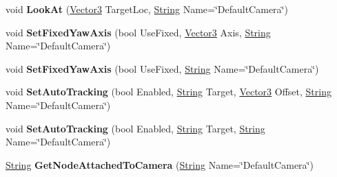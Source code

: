 \begin{DoxyCompactItemize}
\item 
\hypertarget{classphys_1_1CameraManager_a885a499a53c3543b6bf429583a2cb54c}{
void {\bfseries LookAt} (\hyperlink{classphys_1_1Vector3}{Vector3} TargetLoc, \hyperlink{namespacephys_aa03900411993de7fbfec4789bc1d392e}{String} Name=\char`\"{}DefaultCamera\char`\"{})}
\label{d9/d91/classphys_1_1CameraManager_a885a499a53c3543b6bf429583a2cb54c}

\item 
\hypertarget{classphys_1_1CameraManager_ac29a1b3cd34ff2810bee170aa233c77e}{
void {\bfseries SetFixedYawAxis} (bool UseFixed, \hyperlink{classphys_1_1Vector3}{Vector3} Axis, \hyperlink{namespacephys_aa03900411993de7fbfec4789bc1d392e}{String} Name=\char`\"{}DefaultCamera\char`\"{})}
\label{d9/d91/classphys_1_1CameraManager_ac29a1b3cd34ff2810bee170aa233c77e}

\item 
\hypertarget{classphys_1_1CameraManager_aa7370f2239e88ab151b72c4171afea07}{
void {\bfseries SetFixedYawAxis} (bool UseFixed, \hyperlink{namespacephys_aa03900411993de7fbfec4789bc1d392e}{String} Name=\char`\"{}DefaultCamera\char`\"{})}
\label{d9/d91/classphys_1_1CameraManager_aa7370f2239e88ab151b72c4171afea07}

\item 
\hypertarget{classphys_1_1CameraManager_a43d55c71817096add5dad1552239fc74}{
void {\bfseries SetAutoTracking} (bool Enabled, \hyperlink{namespacephys_aa03900411993de7fbfec4789bc1d392e}{String} Target, \hyperlink{classphys_1_1Vector3}{Vector3} Offset, \hyperlink{namespacephys_aa03900411993de7fbfec4789bc1d392e}{String} Name=\char`\"{}DefaultCamera\char`\"{})}
\label{d9/d91/classphys_1_1CameraManager_a43d55c71817096add5dad1552239fc74}

\item 
\hypertarget{classphys_1_1CameraManager_a6edd94b6e8d9f2fa1e0b84554b367933}{
void {\bfseries SetAutoTracking} (bool Enabled, \hyperlink{namespacephys_aa03900411993de7fbfec4789bc1d392e}{String} Target, \hyperlink{namespacephys_aa03900411993de7fbfec4789bc1d392e}{String} Name=\char`\"{}DefaultCamera\char`\"{})}
\label{d9/d91/classphys_1_1CameraManager_a6edd94b6e8d9f2fa1e0b84554b367933}

\item 
\hypertarget{classphys_1_1CameraManager_a52a62fcfbeed45a2f527f626731ddcc1}{
\hyperlink{namespacephys_aa03900411993de7fbfec4789bc1d392e}{String} {\bfseries GetNodeAttachedToCamera} (\hyperlink{namespacephys_aa03900411993de7fbfec4789bc1d392e}{String} Name=\char`\"{}DefaultCamera\char`\"{})}
\label{d9/d91/classphys_1_1CameraManager_a52a62fcfbeed45a2f527f626731ddcc1}


\end{DoxyCompactItemize}
